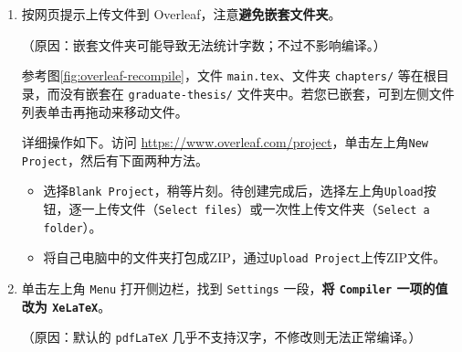 \begin{enumerate}
  \item 按网页提示上传文件到 Overleaf，注意\textbf{避免嵌套文件夹}。

    （原因：嵌套文件夹可能导致无法统计字数；不过不影响编译。）

    参考图\ref{fig:overleaf-recompile}，文件 \texttt{main.tex}、文件夹 \texttt{chapters/} 等在根目录，而没有嵌套在 \texttt{graduate-thesis/} 文件夹中。若您已嵌套，可到左侧文件列表单击再拖动来移动文件。

    详细操作如下。访问 \url{https://www.overleaf.com/project}，单击左上角\texttt{New Project}，然后有下面两种方法。

    \begin{itemize}
      \item 选择\texttt{Blank Project}，稍等片刻。待创建完成后，选择左上角\texttt{Upload}按钮，逐一上传文件（\texttt{Select files}）或一次性上传文件夹（\texttt{Select a folder}）。
      \item 将自己电脑中的文件夹打包成ZIP，通过\texttt{Upload Project}上传ZIP文件。
    \end{itemize}

  \item 单击左上角 \texttt{Menu} 打开侧边栏，找到 \texttt{Settings} 一段，\textbf{将 \texttt{Compiler} 一项的值改为 \texttt{XeLaTeX}}。

    （原因：默认的 \texttt{pdfLaTeX} 几乎不支持汉字，不修改则无法正常编译。）
\end{enumerate}

